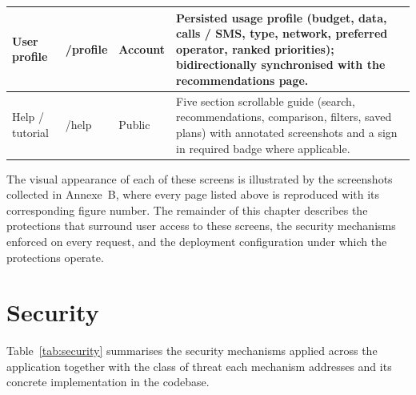 \begin{table}[H]
\begin{tabular}{|p{2.6cm}|p{2.5cm}|p{1.6cm}|p{6.4cm}|}
    User profile       & /profile    & Account & Persisted usage profile (budget, data, calls / SMS, type, network, preferred operator, ranked priorities); bidirectionally synchronised with the recommendations page. \\ \hline
    Help / tutorial    & /help       & Public  & Five section scrollable guide (search, recommendations, comparison, filters, saved plans) with annotated screenshots and a \guillemotleft{}sign in required\guillemotright{} badge where applicable. \\ \hline
  \end{tabular}
\end{table}

The visual appearance of each of these screens is illustrated by the screenshots collected in Annexe~B, where every page listed above is reproduced with its corresponding figure number. The remainder of this chapter describes the protections that surround user access to these screens, the security mechanisms enforced on every request, and the deployment configuration under which the protections operate.

\section{Security}

Table~\ref{tab:security} summarises the security mechanisms applied across the application together with the class of threat each mechanism addresses and its concrete implementation in the codebase.

